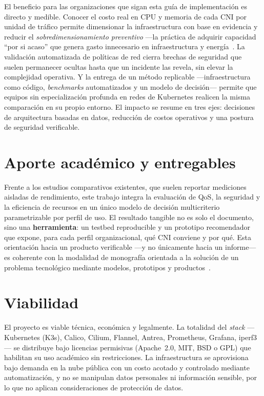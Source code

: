 El beneficio para las organizaciones que sigan esta guía de implementación es directo y medible. Conocer el costo real en CPU y memoria de cada CNI por unidad de tráfico permite dimensionar la infraestructura con base en evidencia y reducir el \emph{sobredimensionamiento preventivo} ---la práctica de adquirir capacidad ``por si acaso'' que genera gasto innecesario en infraestructura y energía~\cite{ref7,ref8}. La validación automatizada de políticas de red cierra brechas de seguridad que suelen permanecer ocultas hasta que un incidente las revela, sin elevar la complejidad operativa. Y la entrega de un método replicable ---infraestructura como código, \emph{benchmarks} automatizados y un modelo de decisión---  permite que equipos sin especialización profunda en redes de Kubernetes realicen la misma comparación en su propio entorno. El impacto se resume en tres ejes: decisiones de arquitectura basadas en datos, reducción de costos operativos y una postura de seguridad verificable.

\section{Aporte académico y entregables}

Frente a los estudios comparativos existentes, que suelen reportar mediciones aisladas de rendimiento, este trabajo integra la evaluación de QoS, la seguridad y la eficiencia de recursos en un único modelo de decisión multicriterio parametrizable por perfil de uso. El resultado tangible no es solo el documento, sino una \textbf{herramienta}: un testbed reproducible y un prototipo recomendador que expone, para cada perfil organizacional, qué CNI conviene y por qué. Esta orientación hacia un producto verificable ---y no únicamente hacia un informe--- es coherente con la modalidad de monografía orientada a la solución de un problema tecnológico mediante modelos, prototipos y productos~\cite{ref29}.

\section{Viabilidad}

El proyecto es viable técnica, económica y legalmente. La totalidad del \emph{stack} ---Kubernetes (K3s), Calico, Cilium, Flannel, Antrea, Prometheus, Grafana, iperf3--- se distribuye bajo licencias permisivas (Apache~2.0, MIT, BSD o GPL) que habilitan su uso académico sin restricciones. La infraestructura se aprovisiona bajo demanda en la nube pública con un costo acotado y controlado mediante automatización, y no se manipulan datos personales ni información sensible, por lo que no aplican consideraciones de protección de datos.
